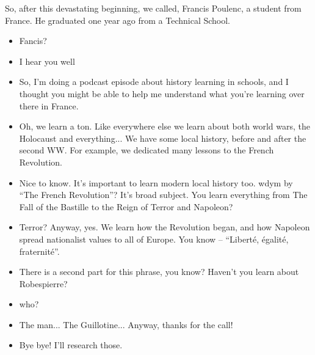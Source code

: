 \documentclass[]{../../../../tex/classes/styledArticle}
\begin{document}
	So, after this devastating beginning, we called, Francis Poulenc, a student from France. He graduated one year ago from a Technical School. 
	\begin{itemize}
		\item[(I)] Fancis? 
		\item[(II)] I hear you well
		\item[(I)] So, I'm doing a podcast episode about history learning in schools, and I thought you might be able to help me understand what you're learning over there in France. 
		\item[(II)] Oh, we learn a ton. Like everywhere else we learn about both world wars, the Holocaust and everything... We have some local history, before and after the second WW. For example, we dedicated many lessons to the French Revolution. 
		\item[(I)] Nice to know. It's important to learn modern local history too. wdym by ``The French Revolution''? It's broad subject. You learn everything from The Fall of the Bastille to the Reign of Terror and Napoleon? 
		\item[(II)] Terror? Anyway, yes. We learn how the Revolution began, and how Napoleon spread nationalist values to all of Europe. You know -- ``Liberté, égalité, fraternité''. 
		\item[(I)] There is a second part for this phrase, you know? Haven't you learn about Robespierre? 
		\item[(II)] who? 
		\item[(I)] The man... The Guillotine... Anyway, thanks for the call!
		\item[(II)] Bye bye! I'll research those. 
	\end{itemize}
	
\end{document}
